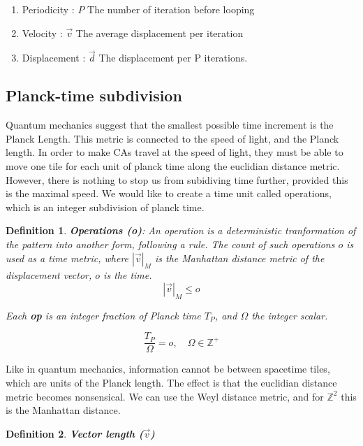 \documentclass[notitlepage]{article}
\newtheorem{definition}{Definition}[section]
\begin{document}
\begin{appendices}
\begin{enumerate}
\item Periodicity : $P$ The number of iteration before looping
\item Velocity : $\vec{v}$ The average displacement per iteration
\item Displacement : $\vec{d}$ The displacement per P iterations.
\end{enumerate}

\subsection{Planck-time subdivision}
Quantum mechanics suggest that the smallest possible time increment is the Planck Length. This metric is connected to the speed of light, and the Planck length. In order to make CAs travel at the speed of light, they must be able to move one tile for each unit of planck time along the euclidian distance metric. However, there is nothing to stop us from subidiving time further, provided this is the maximal speed. We would like to create a time unit called operations, which is an integer subdivision of planck time. 

\begin{definition}
\textbf{ \textit{Operations} \textbf{(o)}}: An operation  is a deterministic tranformation of the pattern into another form, following a rule. The count of such operations $o$ is used as a time metric, where $|\vec{v}|_M$ is the Manhattan distance metric of the displacement vector, $o$ is the time.
\begin{equation}
|\vec{v}|_M \leq o
\end{equation} 

Each \textbf{op} is an integer fraction of Planck time $T_P$, and  $\Omega$ the integer scalar.
 
\begin{equation}
\frac{T_P}{\Omega} = o, \quad \Omega \in \mathbb{Z}^+
\end{equation} 
\end{definition}

Like in quantum mechanics, information cannot be between spacetime tiles, which are units of the Planck length.  The effect is that the euclidian distance metric becomes nonsensical. We can use the Weyl distance metric, and for $\mathbb{Z}^2$ this is the Manhattan distance.

\begin{definition}
\textbf{ \textit{Vector length} \textbf{($\vec{v}$)}}


\end{definition}
\end{appendices}
\end{document}

